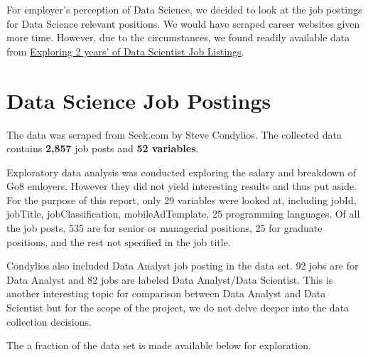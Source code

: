 \documentclass[
  letterpaper,
  DIV=11,
  numbers=noendperiod]{scrreport}
\begin{document}
For employer's perception of Data Science, we decided to look at the job
postings for Data Science relevant positions. We would have scraped
career websites given more time. However, due to the circumstances, we
found readily available data from
\href{https://www.kaggle.com/code/nomilk/exploring-2-years-of-data-scientist-job-listings/data}{Exploring
2 years' of Data Scientist Job Listings}.

\hypertarget{data-science-job-postings}{%
\section{Data Science Job Postings}\label{data-science-job-postings}}

The data was scraped from Seek.com by Steve Condylios. The collected
data contains \textbf{2,857} job posts and \textbf{52 variables}.

Exploratory data analysis was conducted exploring the salary and
breakdown of Go8 emloyers. However they did not yield interesting
results and thus put aside. For the purpose of this report, only 29
variables were looked at, including jobId, jobTitle, jobClassification,
mobileAdTemplate, 25 programming languages. Of all the job posts, 535
are for senior or managerial positions, 25 for graduate positions, and
the rest not specified in the job title.

Condylios also included Data Analyst job posting in the data set. 92
jobs are for Data Analyst and 82 jobs are labeled Data Analyst/Data
Scientist. This is another interesting topic for comparison between Data
Analyst and Data Scientist but for the scope of the project, we do not
delve deeper into the data collection decisions.

The a fraction of the data set is made available below for exploration.
\end{document}
